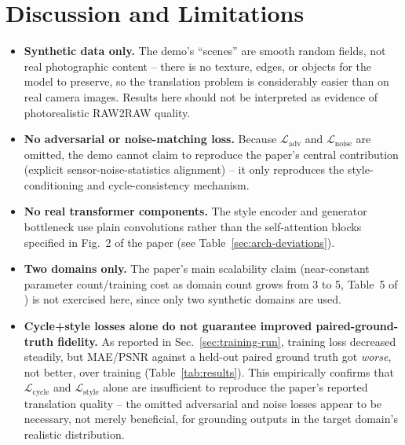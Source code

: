 \documentclass[11pt]{article}
\begin{document}
\section{Discussion and Limitations}

\begin{itemize}[nosep]
    \item \textbf{Synthetic data only.} The demo's ``scenes'' are smooth
          random fields, not real photographic content -- there is no
          texture, edges, or objects for the model to preserve, so the
          translation problem is considerably easier than on real
          camera images. Results here should not be interpreted as
          evidence of photorealistic RAW2RAW quality.
    \item \textbf{No adversarial or noise-matching loss.} Because
          $\mathcal{L}_{\text{adv}}$ and $\mathcal{L}_{\text{noise}}$ are
          omitted, the demo cannot claim to reproduce the paper's central
          contribution (explicit sensor-noise-statistics alignment) --
          it only reproduces the style-conditioning and cycle-consistency
          mechanism.
    \item \textbf{No real transformer components.} The style encoder and
          generator bottleneck use plain convolutions rather than the
          self-attention blocks specified in Fig.~2 of the paper (see
          Table~\ref{sec:arch-deviations}).
    \item \textbf{Two domains only.} The paper's main scalability claim
          (near-constant parameter count/training cost as domain count
          grows from 3 to 5, Table~5 of \cite{merit2026}) is not
          exercised here, since only two synthetic domains are used.
    \item \textbf{Cycle+style losses alone do not guarantee improved
          paired-ground-truth fidelity.} As reported in
          Sec.~\ref{sec:training-run}, training loss decreased steadily,
          but MAE/PSNR against a held-out paired ground truth got
          \emph{worse}, not better, over training (Table~\ref{tab:results}). This
          empirically confirms that $\mathcal{L}_{\text{cycle}}$ and
          $\mathcal{L}_{\text{style}}$ alone are insufficient to
          reproduce the paper's reported translation quality -- the
          omitted adversarial and noise losses appear to be necessary,
          not merely beneficial, for grounding outputs in the target
          domain's realistic distribution.
\end{itemize}
\end{document}

